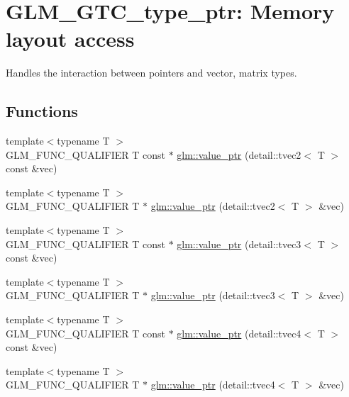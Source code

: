 \hypertarget{group__gtc__type__ptr}{\section{\-G\-L\-M\-\_\-\-G\-T\-C\-\_\-type\-\_\-ptr\-: \-Memory layout access}
\label{group__gtc__type__ptr}
}


\-Handles the interaction between pointers and vector, matrix types.  


\subsection*{\-Functions}
\begin{DoxyCompactItemize}
\item 
{\footnotesize template$<$typename T $>$ }\\\-G\-L\-M\-\_\-\-F\-U\-N\-C\-\_\-\-Q\-U\-A\-L\-I\-F\-I\-E\-R \-T const $\ast$ \hyperlink{group__gtc__type__ptr_ga57d829c43ef1f8bbe196343744392069}{glm\-::value\-\_\-ptr} (detail\-::tvec2$<$ \-T $>$ const \&vec)
\item 
{\footnotesize template$<$typename T $>$ }\\\-G\-L\-M\-\_\-\-F\-U\-N\-C\-\_\-\-Q\-U\-A\-L\-I\-F\-I\-E\-R \-T $\ast$ \hyperlink{group__gtc__type__ptr_ga70900f03d3f6eead08cbeb8eebe2a596}{glm\-::value\-\_\-ptr} (detail\-::tvec2$<$ \-T $>$ \&vec)
\item 
{\footnotesize template$<$typename T $>$ }\\\-G\-L\-M\-\_\-\-F\-U\-N\-C\-\_\-\-Q\-U\-A\-L\-I\-F\-I\-E\-R \-T const $\ast$ \hyperlink{group__gtc__type__ptr_ga10a568d24db822588013d8087b67eaad}{glm\-::value\-\_\-ptr} (detail\-::tvec3$<$ \-T $>$ const \&vec)
\item 
{\footnotesize template$<$typename T $>$ }\\\-G\-L\-M\-\_\-\-F\-U\-N\-C\-\_\-\-Q\-U\-A\-L\-I\-F\-I\-E\-R \-T $\ast$ \hyperlink{group__gtc__type__ptr_ga3dfe9e6a5ebc3beeaa3a8b35cf2ffe1d}{glm\-::value\-\_\-ptr} (detail\-::tvec3$<$ \-T $>$ \&vec)
\item 
{\footnotesize template$<$typename T $>$ }\\\-G\-L\-M\-\_\-\-F\-U\-N\-C\-\_\-\-Q\-U\-A\-L\-I\-F\-I\-E\-R \-T const $\ast$ \hyperlink{group__gtc__type__ptr_ga75dd1f5ad6d007990c1f2cf55fe63789}{glm\-::value\-\_\-ptr} (detail\-::tvec4$<$ \-T $>$ const \&vec)
\item 
{\footnotesize template$<$typename T $>$ }\\\-G\-L\-M\-\_\-\-F\-U\-N\-C\-\_\-\-Q\-U\-A\-L\-I\-F\-I\-E\-R \-T $\ast$ \hyperlink{group__gtc__type__ptr_ga63ee2093cab935f4471fdc55484aeb63}{glm\-::value\-\_\-ptr} (detail\-::tvec4$<$ \-T $>$ \&vec)

\end{DoxyCompactItemize}
